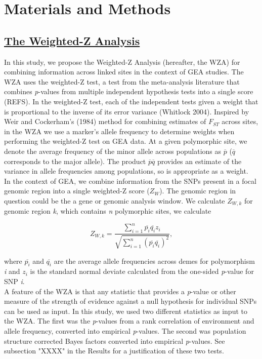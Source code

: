 \documentclass[11pt,twoside,lineno]{GSA_format}
\begin{document}
\section{Materials and Methods}
\label{sec:materials:methods}

\subsection{\underline{The Weighted-Z Analysis}} 

In this study, we propose the Weighted-Z Analysis (hereafter, the WZA) for combining information across linked sites in the context of GEA studies. The WZA uses the weighted-Z test, a test from the meta-analysis literature that combines \textit{p}-values from multiple independent hypothesis tests into a single score (REFS). In the weighted-Z test, each of the independent tests given a weight that is proportional to the inverse of its error variance (Whitlock 2004). Inspired by Weir and Cockerham's (1984) method for combining estimates of $F_{ST}$ across sites, in the WZA we use a marker's allele frequency to determine weights when performing the weighted-Z test on GEA data. At a given polymorphic site, we denote the average frequency of the minor allele across populations as $\overline{p}$ ($\overline{q}$ corresponds to the major allele). The product $\overline{p}\overline{q}$ provides an estimate of the variance in allele frequencies among populations, so is appropriate as a weight. \\

In the context of GEA, we combine information from the SNPs present in a focal genomic region into a single weighted-Z score ($Z_W$). The genomic region in question could be the a gene or genomic analysis window. We calculate $Z_{W,k}$ for genomic region \textit{k}, which contains \textit{n} polymorphic sites, we calculate 

\begin{equation}
\label{weightedZ}
Z_{W,k} =  \frac {\sum\limits_{i=1}^n \overline{p_i} \overline{q_i}z_i}{\sqrt{ \sum\limits_{i=1}^n (\overline{p_i}\overline{q_i})^2} },
\end{equation}

\noindent where $\overline{p_i}$ and $\overline{q_i}$ are the average allele frequencies across demes for polymorphism \textit{i} and $z_i$ is the standard normal deviate calculated from the one-sided \textit{p}-value for SNP \textit{i}. \\

A feature of the WZA is that any statistic that provides a \textit{p}-value or other measure of the strength of evidence against a null hypothesis for individual SNPs can be used as input. In this study, we used two different statistics as input to the WZA. The first was the \textit{p}-values from a rank correlation of environment and allele frequency, converted into empirical \textit{p}-values. The second was population structure corrected Bayes factors converted into empirical \textit{p}-values. See subsection "XXXX" in the Results for a justification of these two tests.\\
\end{document}
